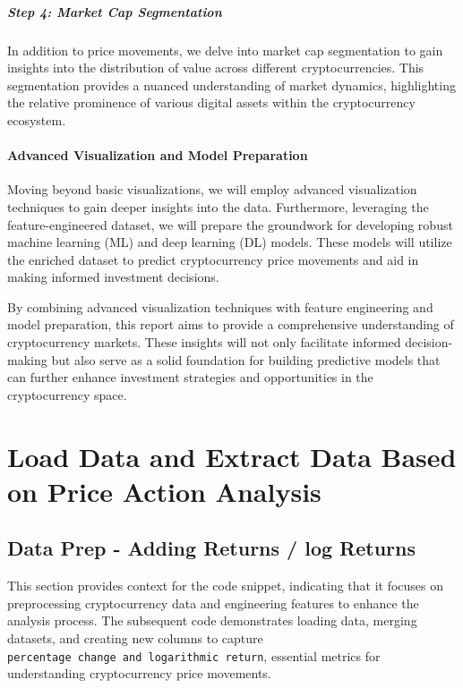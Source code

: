 \documentclass[
]{article}
\begin{document}
\hypertarget{step-4-market-cap-segmentation}{%
\subparagraph{Step 4: Market Cap
Segmentation}\label{step-4-market-cap-segmentation}}

In addition to price movements, we delve into market cap segmentation to
gain insights into the distribution of value across different
cryptocurrencies. This segmentation provides a nuanced understanding of
market dynamics, highlighting the relative prominence of various digital
assets within the cryptocurrency ecosystem.

\hypertarget{advanced-visualization-and-model-preparation}{%
\paragraph{Advanced Visualization and Model
Preparation}\label{advanced-visualization-and-model-preparation}}

Moving beyond basic visualizations, we will employ advanced
visualization techniques to gain deeper insights into the data.
Furthermore, leveraging the feature-engineered dataset, we will prepare
the groundwork for developing robust machine learning (ML) and deep
learning (DL) models. These models will utilize the enriched dataset to
predict cryptocurrency price movements and aid in making informed
investment decisions.

By combining advanced visualization techniques with feature engineering
and model preparation, this report aims to provide a comprehensive
understanding of cryptocurrency markets. These insights will not only
facilitate informed decision-making but also serve as a solid foundation
for building predictive models that can further enhance investment
strategies and opportunities in the cryptocurrency space.

\hypertarget{load-data-and-extract-data-based-on-price-action-analysis}{%
\section{Load Data and Extract Data Based on Price Action
Analysis}\label{load-data-and-extract-data-based-on-price-action-analysis}}

\hypertarget{data-prep---adding-returns-log-returns}{%
\subsection{Data Prep - Adding Returns / log
Returns}\label{data-prep---adding-returns-log-returns}}

This section provides context for the code snippet, indicating that it
focuses on preprocessing cryptocurrency data and engineering features to
enhance the analysis process. The subsequent code demonstrates loading
data, merging datasets, and creating new columns to capture
\texttt{percentage\ change\ and\ logarithmic\ return}, essential metrics
for understanding cryptocurrency price movements.
\end{document}
